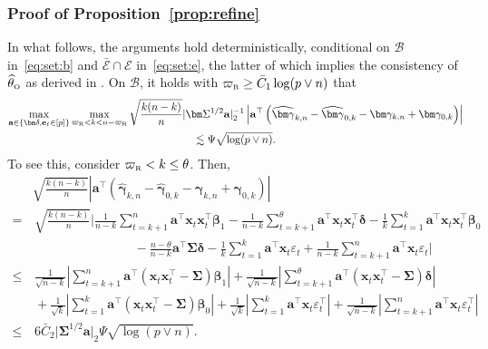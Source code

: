 \documentclass[11pt, a4paper]{article}
\newcommand{\mbf}{\mathbf}
\newcommand{\mc}{\mathcal}
\newcommand{\vep}{\varepsilon}
\renewcommand{\l}{\left}
\renewcommand{\r}{\right}
\def\wh{\widehat}
\newcommand{\cp}{\theta}
\newcommand{\Oc}{\text{\tiny \upshape O}} %
\newcommand{\Rf}{\text{\tiny \upshape R}} %
\theoremstyle{definition}
\theoremstyle{definition}
\theoremstyle{definition}
\theoremstyle{definition}
\theoremstyle{definition}
\theoremstyle{remark}
\theoremstyle{definition}
\theoremstyle{definition}
\theoremstyle{definition}
\begin{document}
\subsubsection{Proof of Proposition~\ref{prop:refine}}

In what follows, the arguments hold deterministically, conditional on $\mc B$ in~\eqref{eq:set:b} and $\bar{\mc E} \cap \mc E$ in~\eqref{eq:set:e}, the latter of which implies the consistency of $\wh\cp_{\Oc}$ as derived in .
On $\mc B$, it holds with $\varpi_{\Rf} \ge \bar{C}_1\log(p \vee n)$ that
\begin{multline}
\label{eq:gamma:a}
\max_{\mbf a \in \{\bm\delta, \mbf e_\ell \in [p]\}} \max_{\varpi_{\Rf} < k < n - \varpi_{\Rf}} \sqrt{\frac{k (n - k)}{n}} \vert \bm\Sigma^{1/2} \mbf a \vert_2^{-1} \l\vert \mbf a^\top \l( \wh{\bm\gamma}_{k, n} - \wh{\bm\gamma}_{0, k} - \bm\gamma_{k, n} + \bm\gamma_{0, k} \r) \r\vert 
\\
\lesssim \Psi\sqrt{\log(p \vee n)}.
\end{multline}
To see this, consider $\varpi_{\Rf} < k \le \cp$. Then,
\begin{align*}
& \sqrt{\frac{k (n - k)}{n}} \l\vert \mbf a^\top \l( \wh{\bm\gamma}_{k, n} - \wh{\bm\gamma}_{0, k} - \bm\gamma_{k, n} + \bm\gamma_{0, k} \r) \r\vert
\\
= & \, \sqrt{\frac{k(n - k)}{n}} \Biggl\vert \frac{1}{n - k} \sum_{t = k + 1}^n \mbf a^\top \mbf x_t \mbf x_t^\top \bm\beta_1  - \frac{1}{n - k} \sum_{t = k + 1}^{\cp} \mbf a^\top \mbf x_t \mbf x_t^\top \bm\delta - \frac{1}{k} \sum_{t = 1}^k \mbf a^\top \mbf x_t \mbf x_t^\top \bm\beta_0 
\\
& \qquad \qquad \qquad \qquad - \frac{n - \cp}{n - k} \mbf a^\top \bm\Sigma \bm\delta  - \frac{1}{k} \sum_{t = 1}^k \mbf a^\top \mbf x_t \vep_t + \frac{1}{n - k} \sum_{t = k + 1}^n \mbf a^\top \mbf x_t \vep_t \Biggr\vert
\\
\le & \, \frac{1}{\sqrt{n - k}} \l\vert \sum_{t = k + 1}^n \mbf a^\top (\mbf x_t \mbf x_t^\top - \bm\Sigma) \bm\beta_1 \r\vert
+ \frac{1}{\sqrt{n - k}} \l\vert \sum_{t = k + 1}^\cp \mbf a^\top (\mbf x_t \mbf x_t^\top - \bm\Sigma) \bm\delta \r\vert
\\
& \, + \frac{1}{\sqrt{k}} \l\vert \sum_{t = 1}^k \mbf a^\top (\mbf x_t \mbf x_t^\top - \bm\Sigma) \bm\beta_0 \r\vert
+ \frac{1}{\sqrt{k}} \l\vert \sum_{t = 1}^k \mbf a^\top \mbf x_t \vep_t^\top \r\vert + \frac{1}{\sqrt{n - k}} \l\vert \sum_{t = k + 1}^n \mbf a^\top \mbf x_t \vep_t^\top \r\vert
\\
\le & \, 6 \bar{C}_2 \vert \bm\Sigma^{1/2} \mbf a \vert_2 \Psi \sqrt{\log(p \vee n)}.
\end{align*}
\end{document}
